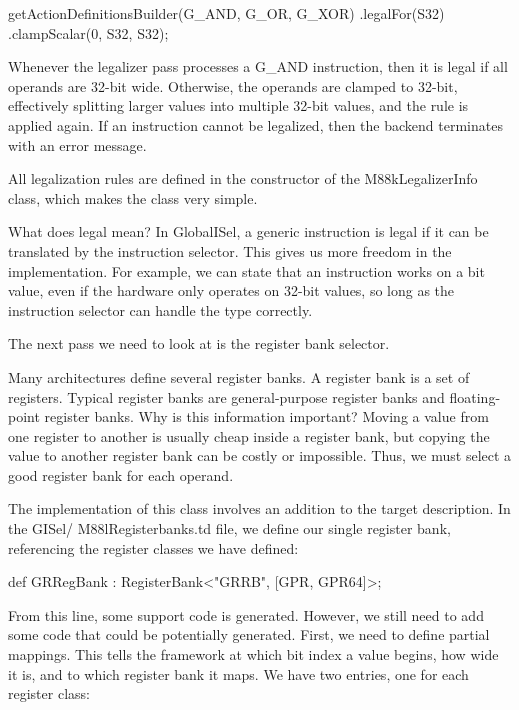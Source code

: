 \begin{cpp}
getActionDefinitionsBuilder({G_AND, G_OR, G_XOR})
    .legalFor({S32})
    .clampScalar(0, S32, S32);
\end{cpp}

Whenever the legalizer pass processes a G\_AND instruction, then it is legal if all operands are 32-bit wide. Otherwise, the operands are clamped to 32-bit, effectively splitting larger values into multiple 32-bit values, and the rule is applied again. If an instruction cannot be legalized, then the backend terminates with an error message.

All legalization rules are defined in the constructor of the M88kLegalizerInfo class, which makes the class very simple.

\begin{myTip}{What does legal mean?}
In GlobalISel, a generic instruction is legal if it can be translated by the instruction selector. This gives us more freedom in the implementation. For example, we can state that an instruction works on a bit value, even if the hardware only operates on 32-bit values, so long as the instruction selector can handle the type correctly.
\end{myTip}

The next pass we need to look at is the register bank selector.


Many architectures define several register banks. A register bank is a set of registers. Typical register banks are general-purpose register banks and floating-point register banks. Why is this information important? Moving a value from one register to another is usually cheap inside a register bank, but copying the value to another register bank can be costly or impossible. Thus, we must select a good register bank for each operand.

The implementation of this class involves an addition to the target description. In the GISel/ M88lRegisterbanks.td file, we define our single register bank, referencing the register classes we have defined:

\begin{cpp}
def GRRegBank : RegisterBank<"GRRB", [GPR, GPR64]>;
\end{cpp}

From this line, some support code is generated. However, we still need to add some code that could be potentially generated. First, we need to define partial mappings. This tells the framework at which bit index a value begins, how wide it is, and to which register bank it maps. We have two entries, one for each register class:

